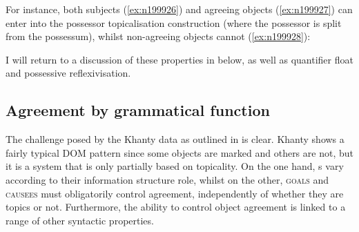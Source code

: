 \documentclass[output=paper
,modfonts
,nonflat]{langsci/langscibook}
\begin{document}
For instance, both subjects (\ref{ex:n199926}) and agreeing objects (\ref{ex:n199927}) can enter into the possessor topicalisation construction (where the possessor is split from the possessum), whilst non-agreeing objects cannot (\ref{ex:n199928}):

\begin{exe}
\ex \citet[][346]{nikolaeva1999} \label{ex:n1999possess}
\begin{xlist}
 \label{ex:n199926}

\label{ex:n199927}

 \label{ex:n199928}
\end{xlist}
\end{exe}

\noindent I will return to a discussion of these properties in  below, as well as quantifier float and possessive reflexivisation.



\subsection{Agreement by grammatical function}
\label{sec:agreementbygf}

The challenge posed by the Khanty data as outlined in  is clear. Khanty shows a fairly typical DOM pattern since some objects are marked and others are not, but it is a system that is only partially based on topicality. 
 On the one hand, \theme s vary according to their information structure role, whilst on the other, \textsc{goals} and \textsc{causees} must obligatorily control agreement, independently of whether they are topics or not.
Furthermore, the ability to control object agreement is linked to a range of other syntactic properties.
\end{document}
